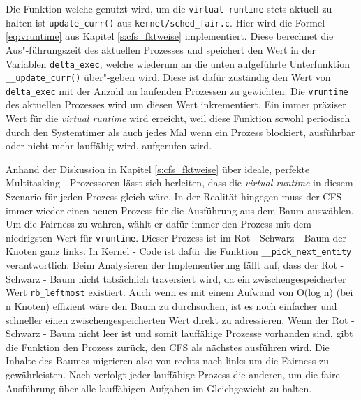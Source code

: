 Die Funktion welche genutzt wird, um die  \texttt{virtual \- runtime} stets aktuell zu halten ist \texttt{update\_curr()} aus \texttt{kernel/sched\_fair.c}. Hier wird die Formel \ref{eq:vruntime} aus Kapitel \ref{s:cfs_fktweise} implementiert. Diese berechnet die Aus"-führungszeit des aktuellen Prozesses und speichert den Wert in der Variablen \texttt{delta\_exec}, welche wiederum an die unten aufgeführte Unterfunktion \texttt{\_\_update\_curr()} über"-geben wird. Diese ist dafür zuständig den Wert von \texttt{delta\-\_exec} mit der Anzahl an laufenden Prozessen zu gewichten. Die \texttt{vruntime} des aktuellen Prozesses wird um diesen Wert inkrementiert.  Ein immer präziser Wert für die \textit{virtual runtime} wird erreicht, weil diese Funktion sowohl periodisch durch den Systemtimer als auch jedes Mal wenn ein Prozess blockiert, ausführbar oder nicht mehr lauffähig wird, aufgerufen wird. 

Anhand der Diskussion in Kapitel \ref{s:cfs_fktweise} über ideale, perfekte Multitasking - Prozessoren lässt sich herleiten, dass die \textit{virtual runtime} in diesem Szenario für jeden Prozess gleich wäre. In der Realität hingegen muss der CFS immer wieder einen neuen Prozess für die Ausführung aus dem Baum auswählen. Um die Fairness zu wahren, wählt er dafür immer den Prozess mit dem niedrigsten Wert für \texttt{vruntime}. Dieser Prozess ist im Rot - Schwarz - Baum der Knoten ganz links. In Kernel - Code ist dafür die Funktion \texttt{\_\_pick\_next\_entity} verantwortlich. Beim Analysieren der Implementierung fällt auf, dass der Rot - Schwarz - Baum nicht tatsächlich traversiert wird, da ein zwischengespeicherter Wert \texttt{rb\_leftmost} existiert. Auch wenn es mit einem Aufwand von O(log n) (bei n Knoten) effizient wäre den Baum zu durchsuchen, ist es noch einfacher und schneller einen zwischengespeicherten Wert direkt zu adressieren. Wenn der Rot - Schwarz - Baum nicht leer ist und somit lauffähige Prozesse vorhanden sind, gibt die Funktion den Prozess zurück, den CFS als nächstes ausführen wird. Die Inhalte des Baumes migrieren also von rechts nach links um die Fairness zu gewährleisten. Nach \cite{mjones} verfolgt jeder lauffähige Prozess die anderen, um die faire Ausführung über alle lauffähigen Aufgaben im Gleichgewicht zu halten.

